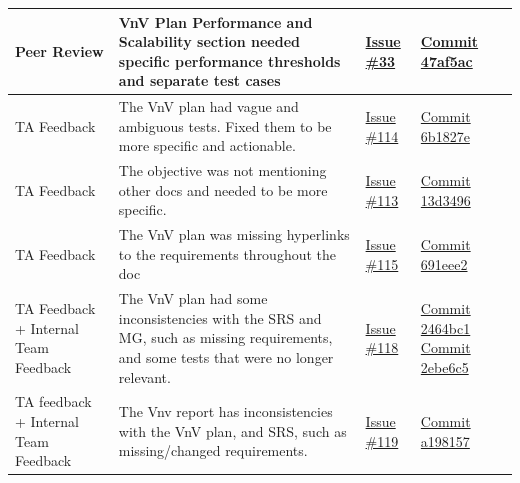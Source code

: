 \documentclass{article}
\begin{document}
\begin{landscape}
\begin{tabularx}{\linewidth}{|P{2.3cm}|Y|P{2.5cm}|P{3.5cm}|}
        \hline
        Peer Review &
        VnV Plan Performance and Scalability section needed specific performance thresholds and separate test cases &
        \href{https://github.com/AlgoCatan/RLCatan/issues/33}{Issue \#33} &
        \href{https://github.com/AlgoCatan/RLCatan/commit/47af5ac567f323701dddd3de27dd0fc482817b64}{Commit 47af5ac} \\

        \hline
        TA Feedback &
        The VnV plan had vague and ambiguous tests. Fixed them to be more specific and actionable. &
        \href{https://github.com/AlgoCatan/RLCatan/issues/114}{Issue \#114} &
        \href{https://github.com/AlgoCatan/RLCatan/commit/6b1827ec1c04290d56bfb580353462eb850ddfde}{Commit 6b1827e} \\

        \hline
        TA Feedback &
        The objective was not mentioning other docs and needed to be more specific. &
        \href{https://github.com/AlgoCatan/RLCatan/issues/113}{Issue \#113} &
        \href{https://github.com/AlgoCatan/RLCatan/commit/13d3496ff300312e43fde72b013d916d51fa17bc}{Commit 13d3496} \\

        \hline
        TA Feedback &
        The VnV plan was missing hyperlinks to the requirements throughout the doc &
        \href{https://github.com/AlgoCatan/RLCatan/issues/115}{Issue \#115} &
        \href{https://github.com/AlgoCatan/RLCatan/commit/691eee22be31b39f1e829ad2b11d6b27e6601f55}{Commit 691eee2} \\

        \hline
        TA Feedback + Internal Team Feedback  &
        The VnV plan had some inconsistencies with the SRS and MG, such as missing requirements, and some tests that were no longer relevant.&
        \href{https://github.com/AlgoCatan/RLCatan/issues/118?issue=AlgoCatan\%7CRLCatan\%7C121}{Issue \#118} &
        \href{https://github.com/AlgoCatan/RLCatan/commit/2464bc1a92d19c0b07620253ed44002eabeb3309}{Commit 2464bc1}
        \href{https://github.com/AlgoCatan/RLCatan/commit/2ebe6c54b84fca5e4cc507d08be7bb31cf51f83b}{Commit 2ebe6c5} \\

        \hline
        TA feedback + Internal Team Feedback  &
        The Vnv report has inconsistencies with the VnV plan, and SRS, such as missing/changed requirements.&
        \href{https://github.com/AlgoCatan/RLCatan/issues/119}{Issue \#119} &
        \href{https://github.com/AlgoCatan/RLCatan/commit/a198157e437e0459938278bd7675ba0cbb7872e1}{Commit a198157} \\


\end{tabularx}
\end{landscape}
\end{document}
